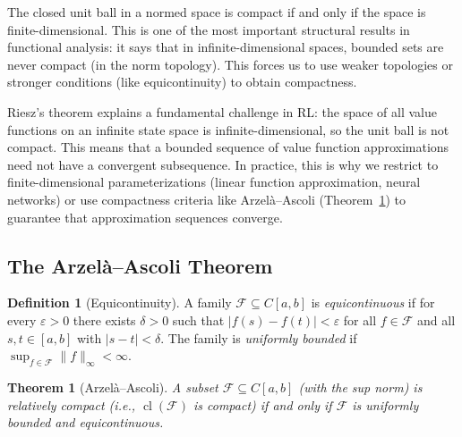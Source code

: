 \documentclass[11pt,a4paper]{article}
\theoremstyle{definition}
\newtheorem{definition}{Definition}[section]
\theoremstyle{plain}
\newtheorem{theorem}{Theorem}[section]
\theoremstyle{remark}
\DeclareMathOperator{\cl}{cl}
\begin{document}
\begin{keyresult}
The closed unit ball in a normed space is compact if and only if the space is
finite-dimensional. This is one of the most important structural results in
functional analysis: it says that in infinite-dimensional spaces, bounded sets are
never compact (in the norm topology). This forces us to use weaker topologies or
stronger conditions (like equicontinuity) to obtain compactness.
\end{keyresult}

\begin{rlconnection}
Riesz's theorem explains a fundamental challenge in RL: the space of all value
functions on an infinite state space is infinite-dimensional, so the unit ball is
not compact. This means that a bounded sequence of value function approximations
need not have a convergent subsequence. In practice, this is why we restrict to
finite-dimensional parameterizations (linear function approximation, neural
networks) or use compactness criteria like Arzel\`{a}--Ascoli
(Theorem~\ref{thm:arzela_ascoli}) to guarantee that approximation sequences converge.
\end{rlconnection}

\subsection{The Arzel\`{a}--Ascoli Theorem}

\begin{definition}[Equicontinuity]
\label{def:equicontinuous}
A family $\mathcal{F} \subseteq C[a,b]$ is \emph{equicontinuous} if for every
$\varepsilon > 0$ there exists $\delta > 0$ such that
$|f(s) - f(t)| < \varepsilon$ for all $f \in \mathcal{F}$ and all $s, t \in [a,b]$
with $|s - t| < \delta$. The family is \emph{uniformly bounded} if
$\sup_{f \in \mathcal{F}} \|f\|_\infty < \infty$.
\end{definition}

\begin{theorem}[Arzel\`{a}--Ascoli]
\label{thm:arzela_ascoli}
A subset $\mathcal{F} \subseteq C[a,b]$ (with the sup norm) is relatively compact
(i.e., $\cl(\mathcal{F})$ is compact) if and only if $\mathcal{F}$ is uniformly
bounded and equicontinuous.
\end{theorem}
\end{document}
